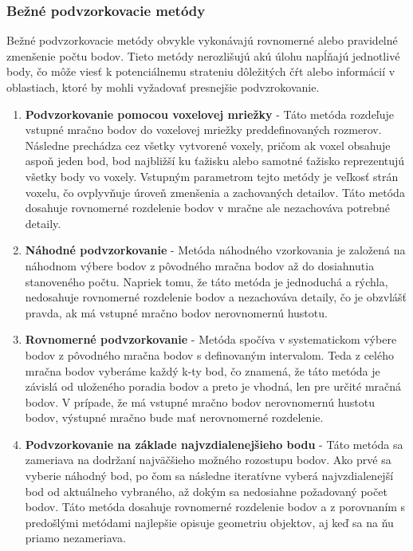 \subsubsection{Bežné podvzorkovacie metódy}
\noindent Bežné podvzorkovacie metódy obvykle vykonávajú rovnomerné alebo pravidelné zmenšenie počtu bodov. Tieto metódy nerozlišujú akú úlohu napĺňajú jednotlivé body, čo môže viesť k potenciálnemu strateniu dôležitých čŕt alebo informácií v oblastiach, ktoré by mohli vyžadovať presnejšie podvzrokovanie.
\begin{enumerate}
  \item\textbf{Podvzorkovanie pomocou voxelovej mriežky} - Táto metóda rozdeľuje vstupné mračno bodov do voxelovej mriežky preddefinovaných rozmerov. Následne prechádza cez všetky vytvorené voxely, pričom ak voxel obsahuje aspoň jeden bod, bod najbližší ku ťažisku alebo samotné ťažisko reprezentujú všetky body vo voxely. Vstupným parametrom tejto metódy je veľkosť strán voxelu, čo ovplyvňuje úroveň zmenšenia a zachovaných detailov. Táto metóda dosahuje rovnomerné rozdelenie bodov v mračne ale nezachováva potrebné detaily.
  \item\textbf{Náhodné podvzorkovanie} - Metóda náhodného vzorkovania je založená na náhodnom výbere bodov z pôvodného mračna bodov až do dosiahnutia stanoveného počtu. Napriek tomu, že táto metóda je jednoduchá a rýchla, nedosahuje rovnomerné rozdelenie bodov a nezachováva detaily, čo je obzvlášť pravda, ak má vstupné mračno bodov nerovnomernú hustotu. 
  \item\textbf{Rovnomerné podvzorkovanie} - Metóda spočíva v systematickom výbere bodov z pôvodného mračna bodov s definovaným intervalom. Teda z celého mračna bodov vyberáme každý k-ty bod, čo znamená, že táto metóda je závislá od uloženého poradia bodov a preto je vhodná, len pre určité mračná bodov. V prípade, že má vstupné mračno bodov nerovnomernú hustotu bodov, 
  výstupné mračno bude mať nerovnomerné rozdelenie.
  \item\textbf{Podvzorkovanie na základe najvzdialenejšieho bodu} - Táto metóda sa zameriava na dodržaní najväčšieho možného rozostupu bodov. Ako prvé sa vyberie náhodný bod, po čom sa následne iteratívne vyberá najvzdialenejší bod od aktuálneho vybraného, až dokým sa  nedosiahne požadovaný počet bodov. Táto metóda dosahuje rovnomerné rozdelenie bodov a z porovnaním s predošlými metódami najlepšie opisuje geometriu objektov, aj keď sa na ňu priamo nezameriava.
\end{enumerate}
